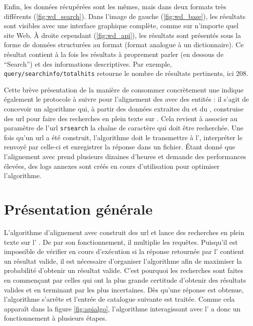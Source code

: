 Enfin, les données récupérées sont les mêmes, mais dans deux formats très différents (\ref{fig:wd_search}). Dans l'image de gauche (\ref{fig:wd_base}), les résultats sont visibles avec une interface graphique complète, comme sur n'importe quel site Web. À droite cependant (\ref{fig:wd_api}), les résultats sont présentés sous la forme de données structurées au format \json{} (format analogue à un \gls{dictionnaire}). Ce résultat contient à la fois les résultats à proprement parler (en dessous de \enquote{Search}) et des informations descriptives. Par exemple, \texttt{query/searchinfo/totalhits} retourne le nombre de résultats pertinents, ici 208.

Cette brève présentation de la manière de consommer concrètement une \api{} indique également le protocole à suivre pour l'alignement des \tname{} avec des entités \wkd{}: il s'agit de concevoir un algorithme qui, à partir des données extraites du \tname{} et du \ttrait{}, construise des \gls{url} pour faire des recherches en plein texte sur \wkd{}. Cela revient à associer au paramètre de l'\gls{url} \texttt{srsearch} la chaîne de caractère qui doit être recherchée. Une fois qu'un \gls{url} a été construit, l'algorithme doit le transmettre à l'\api{}, interpréter le \json{} renvoyé par celle-ci et enregistrer la réponse dans un fichier. Étant donné que l'alignement avec \wkd{} prend plusieurs dizaines d'heures et demande des performances élevées, des \glspl{log} annexes sont créés en cours d'utilisation pour optimiser l'algorithme.


\section{Présentation générale}
L'algorithme d'alignement avec \wkd{} construit des \gls{url} et lance des recherches en plein texte sur l'\api{} \wkd{}. De par son fonctionnement, il multiplie les requêtes. Puisqu'il est impossible de vérifier en cours d'exécution si la réponse retournée par l'\api{} contient un résultat valide, il est nécessaire d'organiser l'algorithme afin de maximiser la probabilité d'obtenir un résultat valide. C'est pourquoi les recherches sont faites en commençant par celles qui ont la plus grande certitude d'obtenir des résultats valides et en terminant par les plus incertaines. Dès qu'une réponse est obtenue, l'algorithme s'arrête et l'entrée de catalogue suivante est traitée. Comme cela apparaît dans la figure \ref{fig:apialgo}, l'algorithme interagissant avec l'\api{} a donc un fonctionnement à plusieurs étapes.

